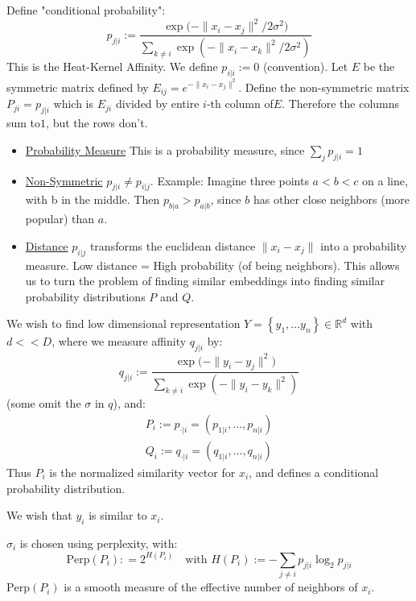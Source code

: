 \documentclass{article}
\begin{document}
\begin{definition} 
Define "conditional probability":
\[
  p_{j | i } := \frac{\exp{(- \lVert  x_i -x_j \rVert ^2 / 2 \sigma ^2 }) }{\sum_{k \neq  i } \exp (- \lVert x_i-x_k \rVert ^2 / 2 \sigma ^2 )}
\]
This is the Heat-Kernel Affinity. We define $p_{i|i} := 0$ (convention). 
  Let $E$ be the symmetric matrix defined by $E_{ij}=e^{- \lVert x_i -x_j \rVert ^2}.$ Define the non-symmetric matrix $P_{ji} = p_{j|i}$ which is $E_{ji}$ divided by entire $
  i$-th column of$E$. Therefore the columns sum to$1$, but the rows don't. 

\begin{itemize}
\item \ul{Probability Measure} This is a probability measure, since $\sum_{j} p_{j|i} = 1$
  \item \ul{Non-Symmetric} $p_{j|i} \neq p_{i|j}$. Example: Imagine three points $a < b < c$ on a line, with b in the middle. Then $p_{b|a} > p_{a | b}$, since $b$ has other close neighbors (more popular) than $a$.  
  \item  \ul{Distance} $p_{i|j}$ transforms the euclidean distance $\lVert x_i - x_j \rVert$ into a probability measure. Low distance = High probability (of being neighbors). This allows us to turn the problem of finding similar embeddings into finding similar probability distributions $P$ and $Q$.
\end{itemize}
\end{definition}
 


\begin{theorem} We wish to find low dimensional representation $Y = \left\{ y_1, \ldots  y_n \right\} \in \mathbb{R}^{d}$ with $d << D$, where we measure affinity $q_{j|i}$ by:
\[
  q_{j | i } := \frac{\exp{(- \lVert  y_i -y_j \rVert ^2 }) }{\sum_{k \neq  i } \exp (- \lVert y_i-y_k \rVert ^2  )}
\]
(some omit the $\sigma$ in $q$),  and:
\begin{gather*}
  P_{i} := p_{\cdot | i} = (p_{1|i}, \ldots, p_{n|i}) \\
  Q_{i} := q_{\cdot | i} = (q_{1|i}, \ldots, q_{n|i})
\end{gather*}
Thus $P_{i}$ is the normalized similarity vector for $x_i$, and defines a conditional probability distribution. 

We wish that $y_i$ is similar to $x_i$. 
\end{theorem}

\begin{definition}[Perplexity] $\sigma_i$ is chosen using perplexity, with:
\[
  \text{Perp}(P_{i}) : = 2^{H(P_i)} \quad \text{with } H(P_i) := - \sum_{j \neq i} p_{j|i} \log_{2} p_{j|i}
\]
  $\text{Perp}(P_i)$ is a smooth measure of the effective number of neighbors of $x_i$. 
\end{definition}
\end{document}
